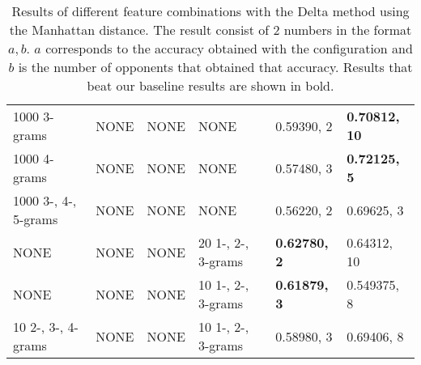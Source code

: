 \begin{landscape}
\begin{table}
\begin{tabular}{llll|ll}
        1000 3-grams & NONE & NONE & NONE & 0.59390, 2 & \textbf{0.70812, 10} \\
        1000 4-grams & NONE & NONE & NONE & 0.57480, 3 & \textbf{0.72125, 5} \\
        1000 3-, 4-, 5-grams & NONE & NONE & NONE & 0.56220, 2 & 0.69625, 3 \\
        NONE & NONE & NONE & 20 1-, 2-, 3-grams & \textbf{0.62780, 2} &
        0.64312, 10 \\
        NONE & NONE & NONE & 10 1-, 2-, 3-grams & \textbf{0.61879, 3} &
        0.549375, 8 \\
        10 2-, 3-, 4-grams & NONE & NONE & 10 1-, 2-, 3-grams & 0.58980, 3 &
        0.69406, 8
    \end{tabular}
    \caption{Results of different feature combinations with the Delta method
    using the Manhattan distance. The result consist of 2 numbers in the format
    $a, b$. $a$ corresponds to the accuracy obtained with the configuration and
    $b$ is the number of opponents that obtained that accuracy. Results that
    beat our baseline results are shown in bold.}
    \label{fig:extended_delta_method_manhattan_result}
\end{table}
\end{landscape}

